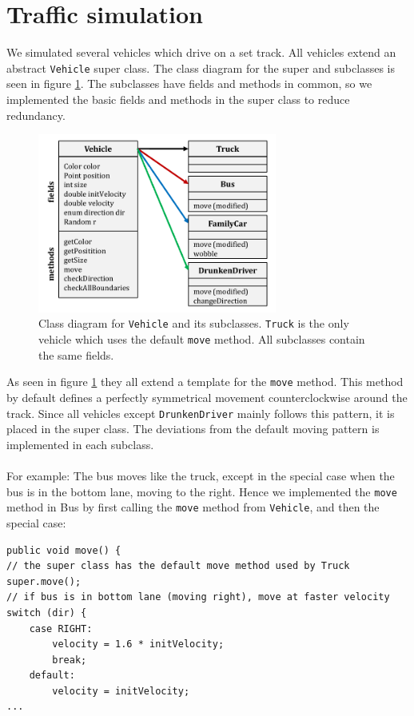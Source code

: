 \section{Traffic simulation}
We simulated several vehicles which drive on a set track. All vehicles extend an abstract \texttt{Vehicle} super class. The class diagram for the super and subclasses is seen in figure \ref{fig:ClassDiagram}. The subclasses have fields and methods in common, so we implemented the basic fields and methods in the super class to reduce redundancy.

\begin{figure}[H]
    \centering
    \includegraphics[width=0.7\textwidth]{TrafficSimulation/fig/classDiagram.pdf}
    \caption{Class diagram for \texttt{Vehicle} and its subclasses. \texttt{Truck} is the only vehicle which uses the default \texttt{move} method. All subclasses contain the same fields.}
    \label{fig:ClassDiagram}
\end{figure}

As seen in figure \ref{fig:ClassDiagram} they all extend a template for the \texttt{move} method. This method by default defines a perfectly symmetrical movement counterclockwise around the track. Since all vehicles except \texttt{DrunkenDriver} mainly follows this pattern, it is placed in the super class. The deviations from the default moving pattern is implemented in each subclass. \\
\\
For example: The bus moves like the truck, except in the special case when the bus is in the bottom lane, moving to the right. Hence we implemented the \texttt{move} method in Bus by first calling the \texttt{move} method from \texttt{Vehicle}, and then the special case:

\begin{lstlisting}
public void move() {
// the super class has the default move method used by Truck
super.move();
// if bus is in bottom lane (moving right), move at faster velocity
switch (dir) {
	case RIGHT:
		velocity = 1.6 * initVelocity;
		break;
	default:
		velocity = initVelocity;
...
\end{lstlisting}


